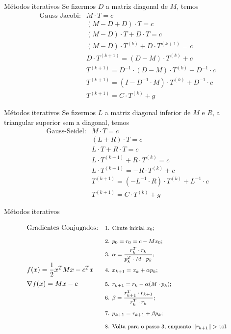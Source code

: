 \documentclass[11pt]{beamer}
\begin{document}
\begin{frame}{Métodos iterativos}
    Se fizermos $D$ a matriz diagonal de $M$, temos
    \[\begin{array}{ll}
        \text{Gauss-Jacobi:} & M \cdot T = c\\
        & (M - D + D)\cdot T = c\\
        & (M - D)\cdot T + D\cdot T = c\\
        & (M - D)\cdot T^{(k)} + D\cdot T^{(k+1)} = c\\
        & D\cdot T^{(k+1)} = (D - M)\cdot T^{(k)} + c\\
        & T^{(k+1)} = D^{-1}\cdot (D - M)\cdot T^{(k)} + D^{-1}\cdot c\\
        & T^{(k+1)} = (I - D^{-1}\cdot M)\cdot T^{(k)} + D^{-1}\cdot c\\
        & T^{(k+1)} = C\cdot T^{(k)} + g
    \end{array}\]
\end{frame}

\begin{frame}{Métodos iterativos}
    Se fizermos $L$ a matriz diagonal inferior de $M$ e $R$, a triangular superior sem a diagonal, temos
    \[\begin{array}{ll}
        \text{Gauss-Seidel:} & M \cdot T = c\\
        & (L+R)\cdot T = c\\
        & L\cdot T + R\cdot T = c\\
        & L\cdot T^{(k+1)} + R\cdot T^{(k)} = c\\
        & L\cdot T^{(k+1)} = -R\cdot T^{(k)} + c\\
        & T^{(k+1)} = (-L^{-1}\cdot R)\cdot T^{(k)} + L^{-1}\cdot c\\
        & T^{(k+1)} = C\cdot T^{(k)} + g
    \end{array}\]
\end{frame}

\begin{frame}{Métodos iterativos}
    \[\renewcommand{\arraystretch}{1.6}
    \begin{array}{ll}
        \text{Gradientes Conjugados:} & \text{\footnotesize 1. Chute inicial $x_0$;}\\
        & \text{\footnotesize 2. $p_0 = r_0 = c - Mx_0$;}\\
        & \text{\footnotesize 3. $\alpha = \dfrac{r_k^T \cdot r_k}{p_k^T \cdot M \cdot p_k}$;}\\
        f(x) = \dfrac{1}{2}x^TMx - c^Tx & \text{\footnotesize 4. $x_{k+1} = x_k + \alpha p_k$;}\\
        \nabla f(x) = Mx - c & \text{\footnotesize 5. $r_{k+1} = r_k - \alpha (M \cdot p_k)$;}\\
        & \text{\footnotesize 6. $\beta = \dfrac{r_{k+1}^T \cdot r_{k+1}}{r_k^T \cdot r_k}$;}\\
        & \text{\footnotesize 7. $p_{k+1} = r_{k+1} + \beta p_k$;}\\
        & \text{\footnotesize 8. Volta para o passo 3, enquanto $\|r_{k+1}\| > $ tol.}\\
    \end{array}\]
\end{frame}
\end{document}
